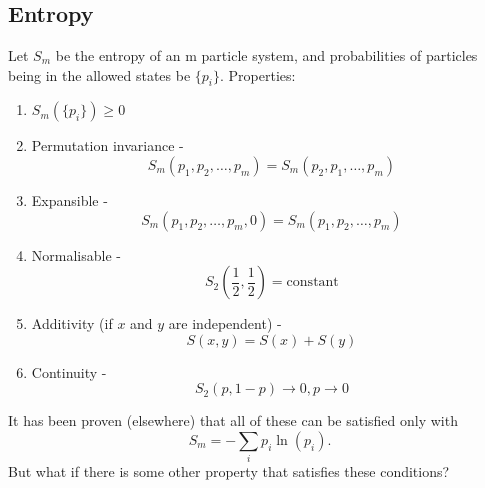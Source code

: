 \documentclass[a4paper, 11pt, normalem]{report}
\begin{document}
\chapter{}
\section{Entropy}
Let $S_m$ be the entropy of an m particle system, and probabilities of particles being in the allowed states be $\{p_i\}$.
Properties:
\begin{enumerate}
    \item $S_m(\{p_i\}) \geq 0$
    \item Permutation invariance -
        \begin{equation}
            S_m(p_1,p_2,\dots,p_m) = S_m(p_2,p_1,\dots,p_m)
        \end{equation}
    \item Expansible -
        \begin{equation}
            S_m(p_1,p_2,\dots,p_m,0) = S_m(p_1,p_2,\dots,p_m)
        \end{equation}
    \item Normalisable - 
        \begin{equation}
            S_2\left(\frac{1}{2},\frac{1}{2}\right) = \text{constant}
        \end{equation}
    \item Additivity (if $x$ and $y$ are independent) - 
        \begin{equation}
            S(x,y) = S(x) + S(y)
        \end{equation}
    \item Continuity -
        \begin{equation}
            S_2(p,1-p) \to 0, p \to 0
        \end{equation}
\end{enumerate}
It has been proven (elsewhere) that all of these can be satisfied only with 
\begin{equation}
    S_m = -\sum_i p_i\ln(p_i).
\end{equation}
But what if there is some other property that satisfies these conditions?
\end{document}
